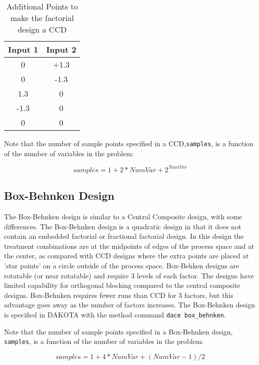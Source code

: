 \begin{table}[ht]
 \caption{Additional Points to make the factorial design a CCD}
 \label{dace:table02}
 \begin{center}
  \begin{tabular}{c|c}
  \hline
  Input 1            & Input 2         \\ \hline \hline 
  0                 & +1.3             \\ \hline 
  0                 & -1.3           \\ \hline
  1.3                 & 0     \\ \hline
  -1.3                 & 0       \\ \hline
  0                  & 0          \\ \hline
  \end{tabular}
\end{center}
\end{table}

Note that the number of sample points specified in a CCD,\texttt{samples},
is a function of the number of variables in the problem: 

\[
samples = 1 + 2*NumVar + 2^{NumVar}
\]

\subsection{Box-Behnken Design}\label{dace:bb}

The Box-Behnken design is similar to a Central Composite design, with
some differences.  The Box-Behnken design is a quadratic design in
that it does not contain an embedded factorial or fractional factorial
design. In this design the treatment combinations are at the midpoints
of edges of the process space and at the center, as compared with CCD
designs where the extra points are placed at 'star points' on a circle
outside of the process space. Box-Behken designs are rotatable (or
near rotatable) and require 3 levels of each factor. The designs have
limited capability for orthogonal blocking compared to the central
composite designs.  Box-Behnken requires fewer runs than CCD for 3
factors, but this advantage goes away as the number of factors
increases.  The Box-Behnken design is specified in DAKOTA with the
method command \texttt{dace box\_behnken}.

Note that the number of sample points specified in a Box-Behnken design,
\texttt{samples}, is a function of the number of variables in the problem: 

\[
samples = 1 + 4*NumVar + (NumVar-1)/2
\]


